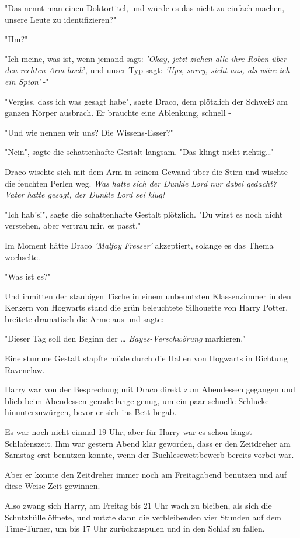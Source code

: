 {"Das nennt man einen Doktortitel, und würde es das nicht zu einfach machen, unsere Leute zu identifizieren?"

"Hm?"

"Ich meine, was ist, wenn jemand sagt: \emph{'Okay, jetzt ziehen alle ihre Roben über den rechten Arm hoch}', und unser Typ sagt: \emph{'Ups, sorry, sieht aus, als wäre ich ein Spion'} -"

"Vergiss, dass ich was gesagt habe", sagte Draco, dem plötzlich der Schweiß am ganzen Körper ausbrach. Er brauchte eine Ablenkung, schnell -

"Und wie nennen wir uns? Die Wissens-Esser?"

"Nein", sagte die schattenhafte Gestalt langsam. "Das klingt nicht richtig…"

Draco wischte sich mit dem Arm in seinem Gewand über die Stirn und wischte die feuchten Perlen weg. \emph{Was hatte sich der Dunkle Lord nur dabei gedacht? Vater hatte gesagt, der Dunkle Lord sei klug!}

"Ich hab's!", sagte die schattenhafte Gestalt plötzlich. "Du wirst es noch nicht verstehen, aber vertrau mir, es passt."

Im Moment hätte Draco \emph{'Malfoy Fresser'} akzeptiert, solange es das Thema wechselte.

"Was ist es?"

Und inmitten der staubigen Tische in einem unbenutzten Klassenzimmer in den Kerkern von Hogwarts stand die grün beleuchtete Silhouette von Harry Potter, breitete dramatisch die Arme aus und sagte:

"Dieser Tag soll den Beginn der … \emph{Bayes-Verschwörung} markieren."

Eine stumme Gestalt stapfte müde durch die Hallen von Hogwarts in Richtung Ravenclaw.

Harry war von der Besprechung mit Draco direkt zum Abendessen gegangen und blieb beim Abendessen gerade lange genug, um ein paar schnelle Schlucke hinunterzuwürgen, bevor er sich ins Bett begab.

Es war noch nicht einmal 19 Uhr, aber für Harry war es schon längst Schlafenszeit. Ihm war gestern Abend klar geworden, dass er den Zeitdreher am Samstag erst benutzen konnte, wenn der Buchlesewettbewerb bereits vorbei war.

Aber er konnte den Zeitdreher immer noch am Freitagabend benutzen und auf diese Weise Zeit gewinnen.

Also zwang sich Harry, am Freitag bis 21 Uhr wach zu bleiben, als sich die Schutzhülle öffnete, und nutzte dann die verbleibenden vier Stunden auf dem Time-Turner, um bis 17 Uhr zurückzuspulen und in den Schlaf zu fallen.

}
